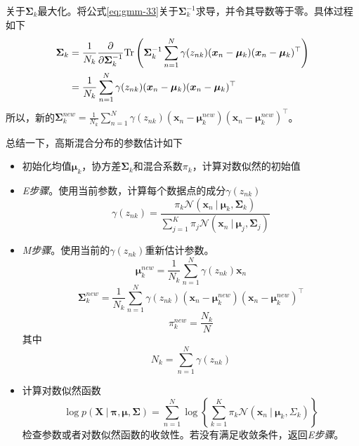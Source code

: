 \documentclass[11pt]{ctexbook}
\begin{document}
关于$\bm\Sigma_k$最大化。将公式\ref{eq:gmm-33}关于$\bm\Sigma_k^{-1}$求导，并令其导数等于零。具体过程如下
\begin{align}
	\bm\Sigma_k & = \frac{1}{N_k}\frac{\partial}{\partial \bm\Sigma_k^{-1}}\mathrm{Tr}\left(\bm\Sigma_k^{-1}\sum_{n=1}^N\gamma(z_{nk})(\bm x_n-\bm \mu_k)(\bm x_n-\bm\mu_k)^\top\right) \notag \\
	& = \frac{1}{N_k}\sum_{n=1}^N\gamma(z_{nk})(\bm x_n-\bm \mu_k)(\bm x_n-\bm\mu_k)^\top
\end{align}
所以，新的$\bm\Sigma_k^{new} = \frac{1}{N_k}\sum_{n=1}^N\gamma(z_{nk})(\bm x_n-\bm \mu_k^{new})(\bm x_n-\bm\mu_k^{new})^\top$。

总结一下，高斯混合分布的参数估计如下
\begin{itemize}
	\item 初始化均值$\bm \mu_k$，协方差$\bm \Sigma_k$和混合系数$\pi_k$，计算对数似然的初始值
	\item \emph{E步骤}。使用当前参数，计算每个数据点的成分$\gamma(z_{nk})$
	\begin{equation}
		\gamma(z_{nk}) = \frac{\pi_k\mathcal N(\bm x_n\ |\ \bm\mu_k,\bm\Sigma_k)}{\sum_{j=1}^K\pi_j\mathcal N(\bm x_n\ |\ \bm\mu_j,\bm\Sigma_j)}
	\end{equation}
	\item \emph{M步骤}。使用当前的$\gamma(z_{nk})$重新估计参数。
	\begin{equation}
		\bm\mu_k^{new} = \frac{1}{N_k}\sum_{n=1}^N\gamma(z_{nk})\bm x_n
	\end{equation}
	\begin{equation}
		\bm\Sigma_k^{new} = \frac{1}{N_k}\sum_{n=1}^N\gamma(z_{nk})(\bm x_n-\bm \mu_k^{new})(\bm x_n-\bm\mu_k^{new})^\top
	\end{equation}
	\begin{equation}
		\pi_k^{new} = \frac{N_k}{N}
	\end{equation}
	其中
	\begin{equation}
		N_k = \sum_{n=1}^N\gamma(z_{nk})
	\end{equation}
	\item 计算对数似然函数
	\begin{equation}
		\log p(\bm X\ |\ \bm \pi, \bm \mu, \bm \Sigma)=\sum_{n=1}^{N}\log\left\{ \sum_{k=1}^{K}\pi_k\mathcal N(\bm x_n\ |\ \bm \mu_k, \Sigma_k) \right\}
	\end{equation}
	检查参数或者对数似然函数的收敛性。若没有满足收敛条件，返回\emph{E步骤}。
\end{itemize}
\end{document}
